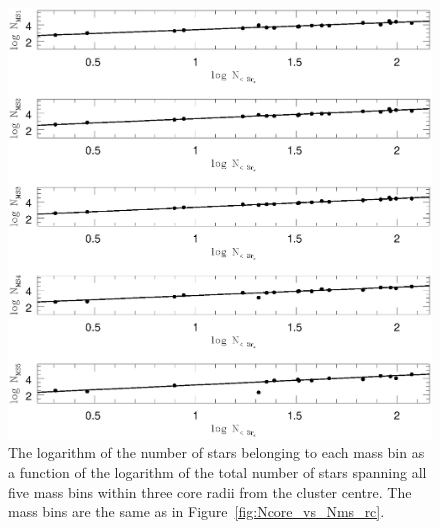 \begin{figure} [!h]
  \begin{center}
 \includegraphics[scale=0.5]{Chapter-6/Ncore_vs_Nms_3rc_new.ps}
 \caption[Logarithm of the number of
 stars belonging to each mass bin as a function of the
 logarithm of the total number of stars spanning all five mass
 bins within three core radii from the cluster centre]{The logarithm of
  the number of
stars belonging to each mass bin as a function of the
logarithm of the total number of stars spanning all five mass
bins within three core radii from the cluster centre.  The mass bins are
the same as in Figure~\ref{fig:Ncore_vs_Nms_rc}.
\label{fig:Ncore_vs_Nms_3rc}}
\end{center}
\end{figure}

